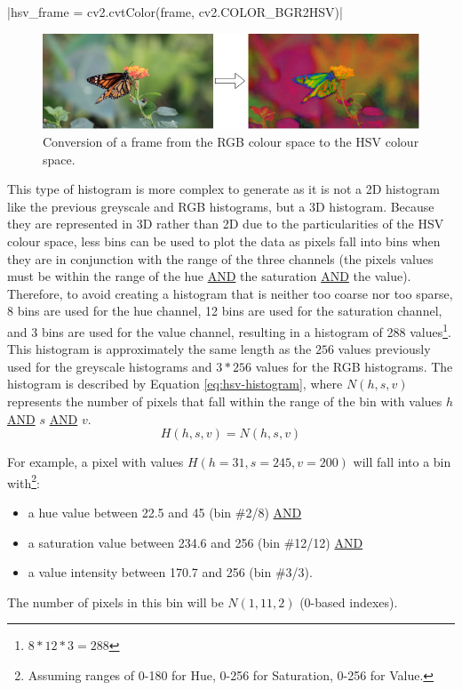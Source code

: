 |hsv_frame = cv2.cvtColor(frame, cv2.COLOR_BGR2HSV)|

\begin{figure}[h] 
\centerline{\includegraphics[width=\textwidth]{figures/implementation/rgb_to_hsv.png}}
\caption{\label{fig:rgb_to_hsv}Conversion of a frame from the RGB colour space to the HSV colour space.}
\end{figure}

This type of histogram is more complex to generate as it is not a 2D histogram like the previous greyscale and RGB histograms, but a 3D histogram. Because they are represented in 3D rather than 2D due to the particularities of the HSV colour space, less bins can be used to plot the data as pixels fall into bins when they are in conjunction with the range of the three channels (the pixels values must be within the range of the hue \underline{AND} the saturation \underline{AND} the value). Therefore, to avoid creating a histogram that is neither too coarse nor too sparse, 8 bins are used for the hue channel, 12 bins are used for the saturation channel, and 3 bins are used for the value channel, resulting in a histogram of 288 values\footnote{$8*12*3=288$}. This histogram is approximately the same length as the $256$ values previously used for the greyscale histograms and $3*256$ values for the RGB histograms. The histogram is described by Equation \ref{eq:hsv-histogram}, where $N(h,s,v)$ represents the number of pixels that fall within the range of the bin with values $h$ \underline{AND} $s$ \underline{AND} $v$.\\
\begin{equation}
\label{eq:hsv-histogram}
    H(h,s,v)=N(h,s,v)
\end{equation}

For example, a pixel with values $H(h=31, s=245, v=200)$ will fall into a bin with\footnote{Assuming ranges of 0-180 for Hue, 0-256 for Saturation, 0-256 for Value.}:
\begin{itemize}
    \item a hue value between 22.5 and 45 (bin \#2/8) \underline{AND}
    \item a saturation value between 234.6 and 256 (bin \#12/12) \underline{AND} 
    \item a value intensity between 170.7 and 256 (bin \#3/3).
\end{itemize}
The number of pixels in this bin will be $N(1,11,2)$ (0-based indexes).\\

